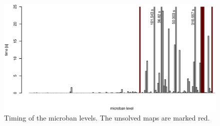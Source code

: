 \begin{figure}[h]
 \centering
 \includegraphics[width=\textwidth]{img/micoban_timing.eps}
 \caption{Timing of the microban levels. The unsolved maps are marked red.}
 \label{fig:microban_timing}
\end{figure}
